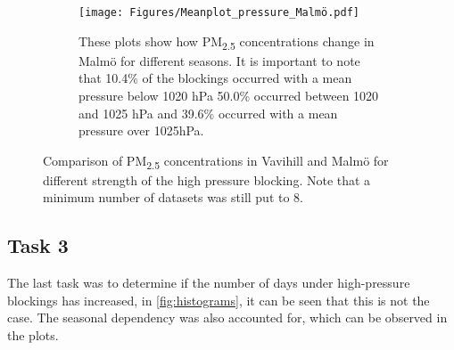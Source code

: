 \begin{figure}[H]
    \hfill
    \begin{subfigure}[b]{0.49\textwidth}
        \centering
        \texttt{[image: Figures/Meanplot\_pressure\_Malmö.pdf]}
        \caption{These plots show how PM\textsubscript{2.5} concentrations change in Malmö for different seasons. It is important to note that 10.4\% of the blockings occurred with a mean pressure below 1020 hPa 50.0\% occurred between 1020 and 1025 hPa and 39.6\% occurred with a mean pressure over 1025hPa.}
        \label{fig:Meanplot_pressure_Malmö}
    \end{subfigure}
    \caption{Comparison of PM\textsubscript{2.5} concentrations in Vavihill and Malmö for different strength of the high pressure blocking. Note that a minimum number of datasets was still put to 8. }
    \label{fig:PM25_blocking_strength}
\end{figure}

\subsection{Task 3}
The last task was to determine if the number of days under high-pressure blockings has increased, in \autoref{fig:histograms}, it can be seen that this is not the case. The seasonal dependency was also accounted for, which can be observed in the plots.


